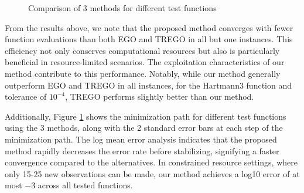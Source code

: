\documentclass [PhD] {package/uclathes}
\begin{document}
\begin{figure}
    \qquad
    \caption{Comparison of 3 methods for different test functions}%
    \label{fig:functions}%
\end{figure}


From the results above, we note that the proposed method converges with fewer function evaluations than both EGO and TREGO {in all but one instances}. This efficiency not only conserves computational resources but also is particularly beneficial in resource-limited scenarios. The exploitation characteristics of our method contribute to this performance. Notably, while our method generally outperform EGO and TREGO in all instances, for the Hartmann3 function and tolerance of $10^{-4}$, TREGO performs slightly better than our method. %

Additionally, Figure \ref{fig:functions} shows the minimization path for different test functions using the 3 methods, {along with the 2 standard error bars  at each step of the minimization path}. The log mean error analysis indicates that the proposed method rapidly decreases the error rate before stabilizing, signifying a faster convergence compared to the alternatives. In constrained resource settings, where only 15-25 new observations can be made, our method achieves a log10 error of at most $-3$ across all tested functions.
\end{document}
